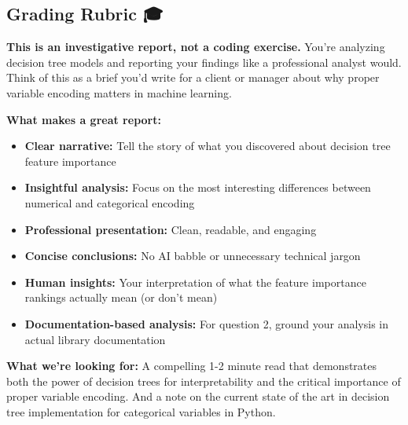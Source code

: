 \documentclass[
  letterpaper,
  DIV=11,
  numbers=noendperiod]{scrartcl}
\providecommand{\tightlist}{%
  \setlength{\itemsep}{0pt}\setlength{\parskip}{0pt}}
\begin{document}
\subsection{Grading Rubric 🎓}\label{grading-rubric}

\begin{tcolorbox}[enhanced jigsaw, rightrule=.15mm, colback=white, breakable, toptitle=1mm, colframe=quarto-callout-important-color-frame, toprule=.15mm, colbacktitle=quarto-callout-important-color!10!white, title=\textcolor{quarto-callout-important-color}{\faExclamation}\hspace{0.5em}{📊 What You're Really Being Graded On}, coltitle=black, bottomtitle=1mm, leftrule=.75mm, bottomrule=.15mm, titlerule=0mm, opacityback=0, arc=.35mm, opacitybacktitle=0.6, left=2mm]

\textbf{This is an investigative report, not a coding exercise.} You're
analyzing decision tree models and reporting your findings like a
professional analyst would. Think of this as a brief you'd write for a
client or manager about why proper variable encoding matters in machine
learning.

\textbf{What makes a great report:}

\begin{itemize}
\tightlist
\item
  \textbf{Clear narrative:} Tell the story of what you discovered about
  decision tree feature importance
\item
  \textbf{Insightful analysis:} Focus on the most interesting
  differences between numerical and categorical encoding
\item
  \textbf{Professional presentation:} Clean, readable, and engaging
\item
  \textbf{Concise conclusions:} No AI babble or unnecessary technical
  jargon
\item
  \textbf{Human insights:} Your interpretation of what the feature
  importance rankings actually mean (or don't mean)
\item
  \textbf{Documentation-based analysis:} For question 2, ground your
  analysis in actual library documentation
\end{itemize}

\textbf{What we're looking for:} A compelling 1-2 minute read that
demonstrates both the power of decision trees for interpretability and
the critical importance of proper variable encoding. And a note on the
current state of the art in decision tree implementation for categorical
variables in Python.

\end{tcolorbox}
\end{document}

